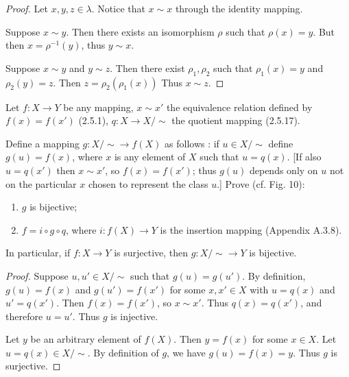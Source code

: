 \begin{proof}
    Let $x, y, z \in \lambda$.
    Notice that $x \sim x$ through the identity mapping.

    Suppose $x \sim y$. Then there exists an isomorphism $\rho$
    such that $\rho(x) = y$. But then $x = \rho^{-1}(y)$,
    thus $y \sim x$.

    Suppose $x \sim y$ and $y \sim z$.
    Then there exist $\rho_1, \rho_2$
    such that $\rho_1(x) = y$ and $\rho_2(y) = z$.
    Then $z = \rho_2(\rho_1(x))$
    Thus $x \sim z$.
\end{proof}

\begin{tcolorbox}[title=Problem 9, breakable]
    Let $f : X \longrightarrow Y$ be any mapping, $x \sim x'$
    the equivalence relation defined by $f(x) = f(x')$ (2.5.1),
    $q : X \longrightarrow X / \sim$ the quotient mapping (2.5.17).
    
    Define a mapping $g : X / \sim \longrightarrow f(X)$ as follows : 
    if $u \in X / \sim$ define $g(u) = f(x)$, where $x$ is any element of $X$
    such that $u = q(x)$. [If also $u = q(x')$ then $x \sim x'$, 
    so $f(x) = f(x')$; thus $g(u)$ depends only on $u$ not on the particular 
    $x$ chosen to represent the class $u$.] Prove (cf. Fig. 10):
    \begin{enumerate}
        \item $g$ is bijective;
        \item $f = i \circ g \circ q$, where $i : f(X) \longrightarrow Y$ is the insertion mapping 
              (Appendix A.3.8).
    \end{enumerate}
    In particular, if $f : X \longrightarrow Y$ is surjective, then $g : X / \sim \longrightarrow Y$ is bijective.
\end{tcolorbox}
\begin{proof}
    Suppose $u, u' \in X / \sim$ such that $g(u) = g(u')$.
    By definition, $g(u) = f(x)$ and $g(u') = f(x')$ for some
    $x, x' \in X$ with $u = q(x)$ and $u' = q(x')$.
    Then $f(x) = f(x')$, so $x \sim x'$.
    Thus $q(x) = q(x')$, and therefore $u = u'$.
    Thus $g$ is injective.

    Let $y$ be an arbitrary element of $f(X)$.
    Then $y = f(x)$ for some $x \in X$.
    Let $u = q(x) \in X / \sim$.
    By definition of $g$, we have $g(u) = f(x) = y$.
    Thus $g$ is surjective.
\end{proof}

